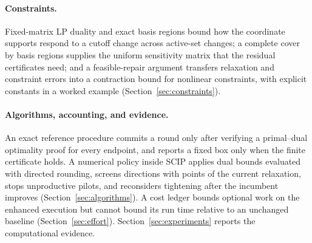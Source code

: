 \paragraph{Constraints.} Fixed-matrix LP duality and exact basis regions
bound how the coordinate supports respond to a cutoff change across
active-set changes; a complete cover by basis regions supplies the uniform
sensitivity matrix that the residual certificates need; and a
feasible-repair argument transfers relaxation and constraint errors into a
contraction bound for nonlinear constraints, with explicit constants in a
worked example (Section~\ref{sec:constraints}).

\paragraph{Algorithms, accounting, and evidence.} An exact reference procedure
commits a round only after verifying a primal--dual optimality proof for
every endpoint, and reports a fixed box only when the finite certificate
holds. A numerical policy
inside SCIP applies dual bounds evaluated with directed rounding, screens
directions with points of the current relaxation, stops unproductive pilots,
and reconsiders tightening after the incumbent improves
(Section~\ref{sec:algorithms}). A cost ledger bounds optional work on the
enhanced execution but cannot bound its run time relative to an unchanged
baseline (Section~\ref{sec:effort}). Section~\ref{sec:experiments} reports
the computational evidence.

